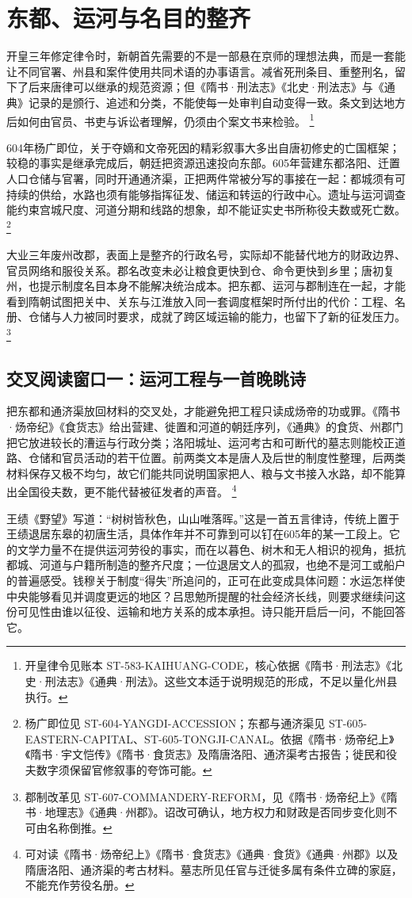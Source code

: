 \section{东都、运河与名目的整齐}
\label{sec:sui-institutions-canal}

开皇三年修定律令时，新朝首先需要的不是一部悬在京师的理想法典，而是一套能让不同官署、州县和案件使用共同术语的办事语言。减省死刑条目、重整刑名，留下了后来唐律可以继承的规范资源；但《隋书·刑法志》《北史·刑法志》与《通典》记录的是颁行、追述和分类，不能使每一处审判自动变得一致。条文到达地方后如何由官员、书吏与诉讼者理解，仍须由个案文书来检验。%
\footnote{开皇律令见账本 ST-583-KAIHUANG-CODE，核心依据《隋书·刑法志》《北史·刑法志》《通典·刑法》。这些文本适于说明规范的形成，不足以量化州县执行。}

604年杨广即位，关于夺嫡和文帝死因的精彩叙事大多出自唐初修史的亡国框架；较稳的事实是继承完成后，朝廷把资源迅速投向东部。605年营建东都洛阳、迁置人口仓储与官署，同时开通通济渠，正把两件常被分写的事接在一起：都城须有可持续的供给，水路也须有能够指挥征发、储运和转运的行政中心。遗址与运河调查能约束宫城尺度、河道分期和线路的想象，却不能证实史书所称役夫数或死亡数。%
\footnote{杨广即位见 ST-604-YANGDI-ACCESSION；东都与通济渠见 ST-605-EASTERN-CAPITAL、ST-605-TONGJI-CANAL。依据《隋书·炀帝纪上》《隋书·宇文恺传》《隋书·食货志》及隋唐洛阳、通济渠考古报告；徙民和役夫数字须保留官修叙事的夸饰可能。}

大业三年废州改郡，表面上是整齐的行政名号，实际却不能替代地方的财政边界、官员网络和服役关系。郡名改变未必让粮食更快到仓、命令更快到乡里；唐初复州，也提示制度名目本身不能解决统治成本。把东都、运河与郡制连在一起，才能看到隋朝试图把关中、关东与江淮放入同一套调度框架时所付出的代价：工程、名册、仓储与人力被同时要求，成就了跨区域运输的能力，也留下了新的征发压力。%
\footnote{郡制改革见 ST-607-COMMANDERY-REFORM，见《隋书·炀帝纪上》《隋书·地理志》《通典·州郡》。诏改可确认，地方权力和财政是否同步变化则不可由名称倒推。}

\subsection{交叉阅读窗口一：运河工程与一首晚眺诗}

把东都和通济渠放回材料的交叉处，才能避免把工程只读成炀帝的功或罪。《隋书·炀帝纪》《食货志》给出营建、徙置和河道的朝廷序列，《通典》的食货、州郡门把它放进较长的漕运与行政分类；洛阳城址、运河考古和可断代的墓志则能校正道路、仓储和官员活动的若干位置。前两类文本是唐人及后世的制度性整理，后两类材料保存又极不均匀，故它们能共同说明国家把人、粮与文书接入水路，却不能算出全国役夫数，更不能代替被征发者的声音。%
\footnote{可对读《隋书·炀帝纪上》《隋书·食货志》《通典·食货》《通典·州郡》以及隋唐洛阳、通济渠的考古材料。墓志所见任官与迁徙多属有条件立碑的家庭，不能充作劳役名册。}

王绩《野望》写道：“树树皆秋色，山山唯落晖。”这是一首五言律诗，传统上置于王绩退居东皋的初唐生活，具体作年并不可靠到可以钉在605年的某一工段上。它的文学力量不在提供运河劳役的事实，而在以暮色、树木和无人相识的视角，抵抗都城、河道与户籍所制造的整齐尺度；一位退居文人的孤寂，也绝不是河工或船户的普遍感受。钱穆关于制度“得失”所追问的，正可在此变成具体问题：水运怎样使中央能够看见并调度更远的地区？吕思勉所提醒的社会经济长线，则要求继续问这份可见性由谁以征役、运输和地方关系的成本承担。诗只能开启后一问，不能回答它。
